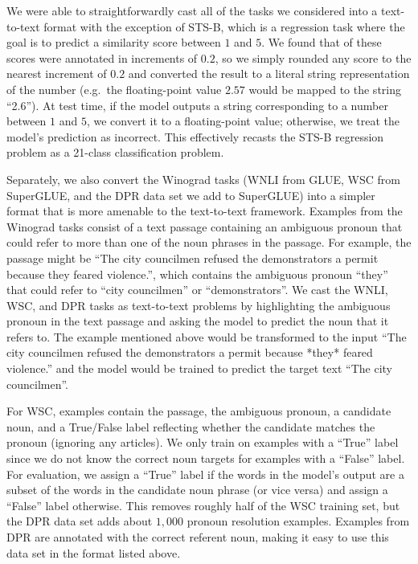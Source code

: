 We were able to straightforwardly cast all of the tasks we considered into a text-to-text format with the exception of STS-B, which is a regression task where the goal is to predict a similarity score between $1$ and $5$. We found that  of these scores were annotated in increments of $0.2$, so we simply rounded any score to the nearest increment of $0.2$ and converted the result to a literal string representation of the number (e.g.\ the floating-point value $2.57$ would be mapped to the string ``2.6''). At test time, if the model outputs a string corresponding to a number between $1$ and $5$, we convert it to a floating-point value; otherwise, we treat the model's prediction as incorrect. This effectively recasts the STS-B regression problem as a 21-class classification problem.

Separately, we also convert the Winograd tasks (WNLI from GLUE, WSC from SuperGLUE, and the DPR data set we add to SuperGLUE) into a simpler format that is more amenable to the text-to-text framework. Examples from the Winograd tasks consist of a text passage containing an ambiguous pronoun that could refer to more than one of the noun phrases in the passage. For example, the passage might be ``The city councilmen refused the demonstrators a permit because they feared violence.'', which contains the ambiguous pronoun ``they'' that could refer to ``city councilmen'' or ``demonstrators''. We cast the WNLI, WSC, and DPR tasks as text-to-text problems by highlighting the ambiguous pronoun in the text passage and asking the model to predict the noun that it refers to. The example mentioned above would be transformed to the input ``The city councilmen refused the demonstrators a permit because *they* feared violence.'' and the model would be trained to predict the target text ``The city councilmen''.

For WSC, examples contain the passage, the ambiguous pronoun, a candidate noun, and a True/False label reflecting whether the candidate matches the pronoun (ignoring any articles). We only train on examples with a ``True'' label since we do not know the correct noun targets for examples with a ``False'' label. For evaluation, we assign a ``True'' label if the words in the model's output are a subset of the words in the candidate noun phrase (or vice versa) and assign a ``False'' label otherwise. This removes roughly half of the WSC training set, but the DPR data set adds about $1{,}000$ pronoun resolution examples. Examples from DPR are annotated with the correct referent noun, making it easy to use this data set in the format listed above.

